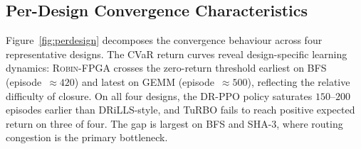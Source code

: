 \documentclass[journal]{IEEEtran}
\begin{document}
\subsection{Per-Design Convergence Characteristics}
\label{sec:perdesign}

Figure~\ref{fig:perdesign} decomposes the convergence behaviour across four representative designs. The CVaR return curves reveal design-specific learning dynamics: \textsc{Robin-FPGA} crosses the zero-return threshold earliest on BFS (episode~$\approx 420$) and latest on GEMM (episode~$\approx 500$), reflecting the relative difficulty of closure. On all four designs, the DR-PPO policy saturates $150$--$200$ episodes earlier than DRiLLS-style, and TuRBO fails to reach positive expected return on three of four. The gap is largest on BFS and SHA-3, where routing congestion is the primary bottleneck.
\end{document}

